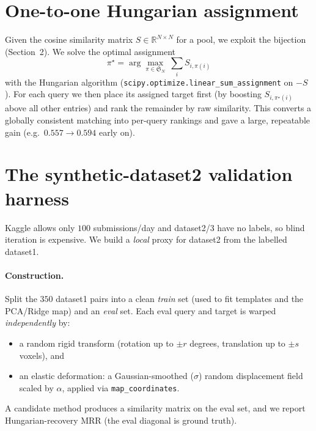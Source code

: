 \documentclass[11pt]{article}
\newcommand{\code}[1]{\texttt{#1}}
\newcommand{\R}{\mathbb{R}}
\begin{document}
\section{One-to-one Hungarian assignment}\label{sec:hungarian}

Given the cosine similarity matrix $S\in\R^{N\times N}$ for a pool, we exploit the
bijection (Section~2). We solve the optimal assignment
\begin{equation}
\pi^\star=\arg\max_{\pi\in \mathfrak{S}_N}\ \sum_{i} S_{i,\pi(i)}
\end{equation}
with the Hungarian algorithm (\code{scipy.optimize.linear\_sum\_assignment} on
$-S$). For each query we then place its assigned target first (by boosting
$S_{i,\pi^\star(i)}$ above all other entries) and rank the remainder by raw
similarity. This converts a globally consistent matching into per-query rankings and
gave a large, repeatable gain (e.g.\ $0.557\to0.594$ early on).

\section{The synthetic-dataset2 validation harness}\label{sec:harness}

Kaggle allows only $100$ submissions/day and dataset2/3 have no labels, so blind
iteration is expensive. We build a \emph{local} proxy for dataset2 from the labelled
dataset1.

\paragraph{Construction.} Split the $350$ dataset1 pairs into a clean \emph{train}
set (used to fit templates and the PCA/Ridge map) and an \emph{eval} set. Each eval
query and target is warped \emph{independently} by:
\begin{itemize}[nosep]
  \item a random rigid transform (rotation up to $\pm r$ degrees, translation up to
        $\pm s$ voxels), and
  \item an elastic deformation: a Gaussian-smoothed ($\sigma$) random displacement
        field scaled by $\alpha$, applied via \code{map\_coordinates}.
\end{itemize}
A candidate method produces a similarity matrix on the eval set, and we report
Hungarian-recovery MRR (the eval diagonal is ground truth).
\end{document}
